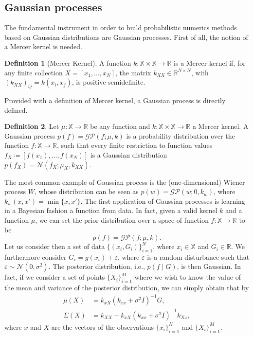 \documentclass{scrartcl}
\theoremstyle{definition}
\newtheorem{definition}{Definition}
\theoremstyle{remark}
\numberwithin{definition}{section}
\numberwithin{remark}{section}
\newcommand{\R}{\mathbb{R}}
\newcommand{\epl}{\varepsilon}
\newcommand{\defeq}{\coloneqq}
\newcommand{\gauss}{\mathcal{N}}
\newcommand{\GP}{\mathcal{GP}}
\begin{document}
\subsection{Gaussian processes}
The fundamental instrument in order to build probabilistic numerics methods based on Gaussian distributions are Gaussian processes. First of all, the notion of a Mercer kernel is needed.
\begin{definition}[Mercer Kernel] A function $k \colon \mathbb{X}\times\mathbb{X}\to\R$ is a Mercer kernel if, for any finite collection $X = [x_1, \ldots, x_N]$, the matrix $k_{XX}\in\R^{N\times N}$, with $(k_{XX})_{ij} = k(x_i, x_j)$, is positive semidefinite. 
\end{definition}
Provided with a definition of Mercer kernel, a Gaussian process is directly defined.
\begin{definition} Let $\mu\colon\mathbb{X}\to \R$ be any function and $k \colon \mathbb{X}\times\mathbb{X}\to\R$ a Mercer kernel. A Gaussian process $p(f) = \GP(f;\mu,k)$ is a probability distribution over the function $f \colon \mathbb{X} \to \R$, such that every finite restriction to function values $f_X \defeq [f(x_1), \ldots, f(x_N)]$ is a Gaussian distribution $p(f_X) = \gauss(f_X; \mu_X, k_{XX})$.
\end{definition}
The most common example of Gaussian process is the (one-dimensional) Wiener process $W$, whose distribution can be seen as $p(w) = \GP(w; 0, k_w)$, where $k_w(x, x') = \min\{x, x'\}$. The first application of Gaussian processes is learning in a Bayesian fashion a function from data. In fact, given a valid kernel $k$ and a function $\mu$, we can set the prior distribution over a space of function $f\colon \mathbb{X} \to \R$ to be
\begin{equation}
	p(f) = \GP(f; \mu, k).
\end{equation}
Let us consider then a set of data $\{(x_i, G_i)\}_{i=1}^N$, where $x_i \in \mathbb{X}$ and $G_i \in \R$. We furthermore consider $G_i = g(x_i) + \epl$, where $\epl$ is a random disturbance such that $\epl \sim \gauss(0, \sigma^2)$. The posterior distribution, i.e., $p(f\mid G)$, is then Gaussian. In fact, if we consider a set of points $\{X_i\}_{i=1}^M$ where we wish to know the value of the mean and variance of the posterior distribution, we can simply obtain that by
\begin{align}
	\mu(X) &= k_{xX}(k_{xx} + \sigma^2 I)^{−1}G,\\
	\Sigma(X) &= k_{XX} - k_{xX}(k_{xx} + \sigma^2 I)^{-1}k_{Xx},
\end{align}
where $x$ and $X$ are the vectors of the observations $\{x_i\}_{i=1}^N$ and $\{X_i\}_{i=1}^M$.
\end{document}
